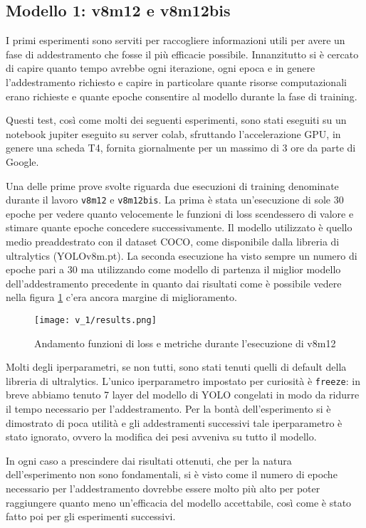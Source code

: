 \subsection*{Modello 1: v8m12 e v8m12bis}

I primi esperimenti sono serviti per raccogliere informazioni utili per avere un fase di 
addestramento che fosse il più efficacie possibile. Innanzitutto si è cercato di capire quanto
tempo avrebbe ogni iterazione, ogni epoca e in genere l'addestramento richiesto e capire 
in particolare quante risorse computazionali erano richieste e quante epoche consentire
al modello durante la fase di training.

Questi test, così come molti dei seguenti esperimenti, sono stati eseguiti su un notebook
jupiter eseguito su server colab, sfruttando l'accelerazione GPU, in genere una scheda T4, 
fornita giornalmente per un massimo di 3 ore da parte di Google.


Una delle prime prove svolte riguarda due esecuzioni di training denominate durante il lavoro
\verb+v8m12+ e \verb+v8m12bis+. La prima è stata un'esecuzione di sole 30 epoche per vedere quanto 
velocemente le funzioni di loss scendessero di valore e stimare quante epoche concedere successivamente.
Il modello utilizzato è quello medio preaddestrato con il dataset COCO, come disponibile dalla libreria 
di ultralytics (YOLOv8m.pt).
La seconda esecuzione ha visto sempre un numero di epoche pari a 30 ma utilizzando come modello di
partenza il miglior modello dell'addestramento precedente in quanto dai risultati come è possibile vedere 
nella figura \ref{fig:v1-1} c'era ancora margine di miglioramento.

\begin{figure}[h]
    \centering
    \texttt{[image: v\_1/results.png]}
    \caption{Andamento funzioni di loss e metriche durante l'esecuzione di v8m12}
    \label{fig:v1-1}
    \end{figure}

Molti degli iperparametri, se non tutti, sono stati tenuti quelli di default della libreria di ultralytics.
L'unico iperparametro impostato per curiosità è \verb|freeze|: in breve abbiamo tenuto 7 layer del modello 
di YOLO congelati in modo da ridurre il tempo necessario per l'addestramento. Per la bontà dell'esperimento
si è dimostrato di poca utilità e gli addestramenti successivi tale iperparametro è stato ignorato, 
ovvero la modifica dei pesi avveniva su tutto il modello.



In ogni caso a prescindere dai risultati ottenuti, che per la natura dell'esperimento non sono
fondamentali, si è visto come il numero di epoche necessario per 
l'addestramento dovrebbe essere molto più alto per poter raggiungere quanto meno un'efficacia del modello
accettabile, così come è stato fatto poi per gli esperimenti successivi.